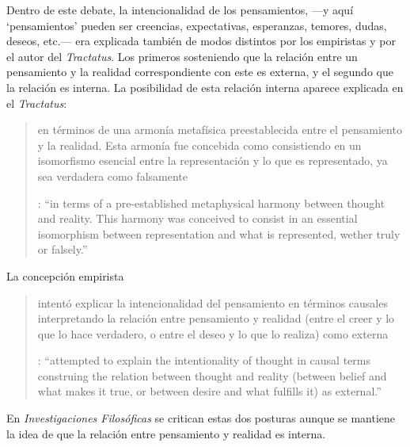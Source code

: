 Dentro de este debate, la intencionalidad de los pensamientos, ---y aquí `pensamientos' pueden ser creencias, expectativas, esperanzas, temores, dudas, deseos, etc.--- era explicada también de modos distintos por los empiristas y por el autor del \emph{Tractatus}. Los primeros sosteniendo que la relación entre un pensamiento y la realidad correspondiente con este es externa, y el segundo que la relación es interna. La posibilidad de esta relación interna aparece explicada en el \emph{Tractatus}: \blockquote[{\cite[3]{hacker2000mind}}: \enquote{in terms of a pre-established metaphysical harmony between thought and reality. This harmony was conceived to consist in an essential isomorphism between representation and what is represented, wether truly or falsely.}]{en términos de una armonía metafísica preestablecida entre el pensamiento y la realidad. Esta armonía fue concebida como consistiendo en un isomorfismo esencial entre la representación y lo que es representado, ya sea verdadera como falsamente}. La concepción empirista \blockquote[{\cite[3]{hacker2000mind}}: \enquote{attempted to explain the intentionality of thought in causal terms \textelp{} construing the relation between thought and reality (between belief and what makes it true, or between desire and what fulfills it) as external.}]{intentó explicar la intencionalidad del pensamiento en términos causales \textelp{} interpretando la relación entre pensamiento y realidad (entre el creer y lo que lo hace verdadero, o entre el deseo y lo que lo realiza) como externa}. En \emph{Investigaciones Filosóficas} se critican estas dos posturas aunque se mantiene la idea de que la relación entre pensamiento y realidad es interna.

